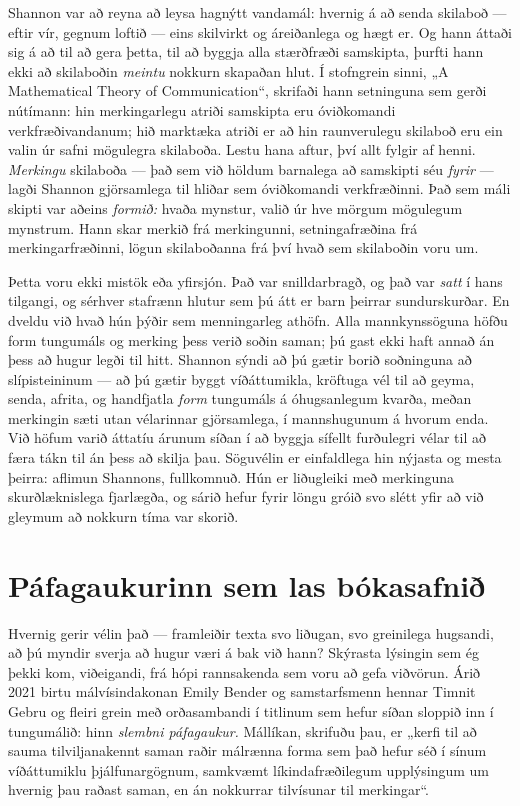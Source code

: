 Shannon var að reyna að leysa hagnýtt vandamál: hvernig á að senda skilaboð — eftir vír, gegnum loftið — eins skilvirkt og áreiðanlega og hægt er. Og hann áttaði sig á að til að gera þetta, til að byggja alla stærðfræði samskipta, þurfti hann ekki að skilaboðin \emph{meintu} nokkurn skapaðan hlut. Í stofngrein sinni, „A Mathematical Theory of Communication“, skrifaði hann setninguna sem gerði nútímann: hin merkingarlegu atriði samskipta eru óviðkomandi verkfræðivandanum; hið marktæka atriði er að hin raunverulegu skilaboð eru ein valin úr safni mögulegra skilaboða. Lestu hana aftur, því allt fylgir af henni. \emph{Merkingu} skilaboða — það sem við höldum barnalega að samskipti séu \emph{fyrir} — lagði Shannon gjörsamlega til hliðar sem óviðkomandi verkfræðinni. Það sem máli skipti var aðeins \emph{formið:} hvaða mynstur, valið úr hve mörgum mögulegum mynstrum. Hann skar merkið frá merkingunni, setningafræðina frá merkingarfræðinni, lögun skilaboðanna frá því hvað sem skilaboðin voru um.

Þetta voru ekki mistök eða yfirsjón. Það var snilldarbragð, og það var \emph{satt} í hans tilgangi, og sérhver stafrænn hlutur sem þú átt er barn þeirrar sundurskurðar. En dveldu við hvað hún þýðir sem menningarleg athöfn. Alla mannkynssöguna höfðu form tungumáls og merking þess verið soðin saman; þú gast ekki haft annað án þess að hugur legði til hitt. Shannon sýndi að þú gætir borið soðninguna að slípisteininum — að þú gætir byggt víðáttumikla, kröftuga vél til að geyma, senda, afrita, og handfjatla \emph{form} tungumáls á óhugsanlegum kvarða, meðan merkingin sæti utan vélarinnar gjörsamlega, í mannshugunum á hvorum enda. Við höfum varið áttatíu árunum síðan í að byggja sífellt furðulegri vélar til að færa tákn til án þess að skilja þau. Söguvélin er einfaldlega hin nýjasta og mesta þeirra: aflimun Shannons, fullkomnuð. Hún er liðugleiki með merkinguna skurðlæknislega fjarlægða, og sárið hefur fyrir löngu gróið svo slétt yfir að við gleymum að nokkurn tíma var skorið.

\section*{Páfagaukurinn sem las bókasafnið}

Hvernig gerir vélin það — framleiðir texta svo liðugan, svo greinilega hugsandi, að þú myndir sverja að hugur væri á bak við hann? Skýrasta lýsingin sem ég þekki kom, viðeigandi, frá hópi rannsakenda sem voru að gefa viðvörun. Árið 2021 birtu málvísindakonan Emily Bender og samstarfsmenn hennar Timnit Gebru og fleiri grein með orðasambandi í titlinum sem hefur síðan sloppið inn í tungumálið: hinn \emph{slembni páfagaukur.} Mállíkan, skrifuðu þau, er „kerfi til að sauma tilviljanakennt saman raðir málrænna forma sem það hefur séð í sínum víðáttumiklu þjálfunargögnum, samkvæmt líkindafræðilegum upplýsingum um hvernig þau raðast saman, en án nokkurrar tilvísunar til merkingar“.

